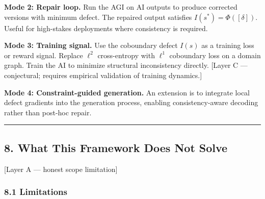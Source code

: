 \documentclass[
]{article}
\begin{document}
\textbf{Mode 2: Repair loop.} Run the AGI on AI outputs to produce
corrected versions with minimum defect. The repaired output satisfies
\(I(s^*) = \Phi([\delta])\). Useful for high-stakes deployments where
consistency is required.

\textbf{Mode 3: Training signal.} Use the coboundary defect \(I(s)\) as
a training loss or reward signal. Replace \(\ell^2\) cross-entropy with
\(\ell^1\) coboundary loss on a domain graph. Train the AI to minimize
structural inconsistency directly. {[}Layer C --- conjectural; requires
empirical validation of training dynamics.{]}

\textbf{Mode 4: Constraint-guided generation.} An extension is to
integrate local defect gradients into the generation process, enabling
consistency-aware decoding rather than post-hoc repair.

\begin{center}\rule{0.5\linewidth}{0.5pt}\end{center}

\subsection{8. What This Framework Does Not
Solve}\label{what-this-framework-does-not-solve}

{[}Layer A --- honest scope limitation{]}

\subsubsection{8.1 Limitations}\label{limitations}
\end{document}
